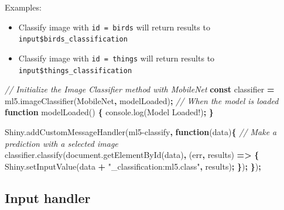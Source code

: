\documentclass[
]{krantz}
\makeatletter
\newenvironment{Shaded}{\begin{snugshade}}{\end{snugshade}}
\newcommand{\AttributeTok}[1]{\textcolor[rgb]{0.61,0.61,0.61}{#1}}
\newcommand{\CommentTok}[1]{\textcolor[rgb]{0.37,0.37,0.37}{\textit{#1}}}
\newcommand{\KeywordTok}[1]{\textcolor[rgb]{0.27,0.27,0.27}{\textbf{#1}}}
\newcommand{\NormalTok}[1]{#1}
\newcommand{\OperatorTok}[1]{\textcolor[rgb]{0.43,0.43,0.43}{\textbf{#1}}}
\newcommand{\StringTok}[1]{\textcolor[rgb]{0.5,0.5,0.5}{#1}}
\newcommand{\VariableTok}[1]{\textcolor[rgb]{0,0,0}{#1}}
\providecommand{\tightlist}{%
  \setlength{\itemsep}{0pt}\setlength{\parskip}{0pt}}
\newenvironment{kframe}{%
\medskip{}
\setlength{\fboxsep}{.8em}
 \def\at@end@of@kframe{}%
 \ifinner\ifhmode%
  \def\at@end@of@kframe{\end{minipage}}%
  \begin{minipage}{\columnwidth}%
 \fi\fi%
 \def\FrameCommand##1{\hskip\@totalleftmargin \hskip-\fboxsep
 \colorbox{shadecolor}{##1}\hskip-\fboxsep
     \hskip-\linewidth \hskip-\@totalleftmargin \hskip\columnwidth}%
 \MakeFramed {\advance\hsize-\width
   \@totalleftmargin\z@ \linewidth\hsize
   \@setminipage}}%
 {\par\unskip\endMakeFramed%
 \at@end@of@kframe}
\renewenvironment{Shaded}{\begin{kframe}}{\end{kframe}}
\makeatother
\begin{document}
Examples:

\begin{itemize}
\tightlist
\item
  Classify image with \texttt{id\ =\ \textquotesingle{}birds\textquotesingle{}} will return results to \texttt{input\$birds\_classification}
\item
  Classify image with \texttt{id\ =\ \textquotesingle{}things\textquotesingle{}} will return results to \texttt{input\$things\_classification}
\end{itemize}

\begin{Shaded}
\begin{Highlighting}[]
\CommentTok{// Initialize the Image Classifier method with MobileNet}
\KeywordTok{const}\NormalTok{ classifier }\OperatorTok{=} \VariableTok{ml5}\NormalTok{.}\AttributeTok{imageClassifier}\NormalTok{(}\StringTok{\textquotesingle{}MobileNet\textquotesingle{}}\OperatorTok{,}\NormalTok{ modelLoaded)}\OperatorTok{;}
\CommentTok{// When the model is loaded}
\KeywordTok{function} \AttributeTok{modelLoaded}\NormalTok{() }\OperatorTok{\{}
  \VariableTok{console}\NormalTok{.}\AttributeTok{log}\NormalTok{(}\StringTok{\textquotesingle{}Model Loaded!\textquotesingle{}}\NormalTok{)}\OperatorTok{;}
\OperatorTok{\}}

\VariableTok{Shiny}\NormalTok{.}\AttributeTok{addCustomMessageHandler}\NormalTok{(}\StringTok{\textquotesingle{}ml5{-}classify\textquotesingle{}}\OperatorTok{,} \KeywordTok{function}\NormalTok{(data)}\OperatorTok{\{}
  \CommentTok{// Make a prediction with a selected image}
  \VariableTok{classifier}\NormalTok{.}\AttributeTok{classify}\NormalTok{(}\VariableTok{document}\NormalTok{.}\AttributeTok{getElementById}\NormalTok{(data)}\OperatorTok{,}\NormalTok{ (err}\OperatorTok{,}\NormalTok{ results) }\KeywordTok{=>} \OperatorTok{\{}
    \VariableTok{Shiny}\NormalTok{.}\AttributeTok{setInputValue}\NormalTok{(data }\OperatorTok{+} \StringTok{"\_classification:ml5.class"}\OperatorTok{,}\NormalTok{ results)}\OperatorTok{;}
  \OperatorTok{\}}\NormalTok{)}\OperatorTok{;}
\OperatorTok{\}}\NormalTok{)}\OperatorTok{;}
\end{Highlighting}
\end{Shaded}

\hypertarget{shiny-complete-pkg-input-handler}{%
\subsection{Input handler}\label{shiny-complete-pkg-input-handler}}
\end{document}
